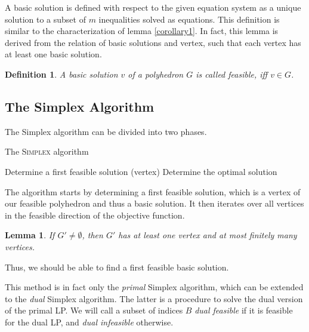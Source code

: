 \documentclass[a4paper, 11pt]{article}
\newtheorem{mydef}{Definition}
\newtheorem{lemma}{Lemma}
\begin{document}
A basic solution is defined with respect to the given equation system as a unique solution to a subset of $m$ inequalities solved as equations. This definition is similar to the characterization of lemma \ref{corollary1}. In fact, this lemma is derived from the relation of basic solutions and vertex, such that each vertex has at least one basic solution.\medskip

\begin{mydef}
	A basic solution $v$ of a polyhedron $G$ is called \emph{feasible}, iff $v\in G$.
\end{mydef}

\subsection{The Simplex Algorithm}
The Simplex algorithm can be divided into two phases.
\begin{algorithm}[H]
	\caption{The \textsc{Simplex} algorithm}
	\label{alg:seq}
	\begin{algorithmic}[1]
		\STATE Determine a first feasible solution (vertex)
		\STATE Determine the optimal solution
	\end{algorithmic}
\end{algorithm}

The algorithm starts by determining a first feasible solution, which is a vertex of our feasible polyhedron and thus a basic solution. It then iterates over all vertices in the feasible direction of the objective function.

\begin{lemma}
	If $G'\neq\emptyset$, then $G'$ has at least one vertex and at most finitely many vertices.
\end{lemma}

Thus, we should be able to find a first feasible basic solution.\medskip

This method is in fact only the \textit{primal} Simplex algorithm, which can be extended to the \textit{dual} Simplex algorithm. The latter is a procedure to solve the dual version of the primal LP. We will call a subset of indices $B$ \textit{dual feasible} if it is feasible for the dual LP, and \textit{dual infeasible} otherwise.
\end{document}
